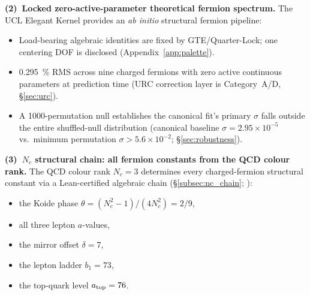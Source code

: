 \documentclass[11pt]{article}
\theoremstyle{remark}
\begin{document}
\medskip
\noindent\textbf{(2)~Locked zero-active-parameter theoretical fermion spectrum.}
The UCL Elegant Kernel provides an \emph{ab initio} structural fermion pipeline:
\begin{itemize}[leftmargin=1.5em,itemsep=0.15em,topsep=0.2em]
  \item Load-bearing algebraic identities are fixed by GTE/Quarter-Lock; one centering DOF is disclosed (Appendix~\ref{app:palette}).
  \item \SI{0.295}{\percent} RMS across nine charged fermions with zero active continuous parameters at prediction time (URC correction layer is Category~A/D, \S\ref{sec:urc}).
  \item A 1000-permutation null establishes the canonical fit's primary $\sigma$ falls outside the entire shuffled-null distribution (canonical baseline $\sigma = 2.95\times10^{-5}$ vs.\ minimum permutation $\sigma > 5.6\times10^{-2}$; \S\ref{sec:robustness}).
\end{itemize}


\medskip
\noindent\textbf{(3)~$N_c$ structural chain: all fermion constants from the QCD colour rank.}
The QCD colour rank $N_c = 3$ determines every charged-fermion structural constant via a Lean-certified algebraic chain (\S\ref{subsec:nc_chain}; ):
\begin{itemize}[leftmargin=1.5em,itemsep=0.1em,topsep=0.2em]
  \item the Koide phase $\theta = (N_c^2{-}1)/(4N_c^2) = 2/9$,
  \item all three lepton $a$-values,
  \item the mirror offset $\delta = 7$,
  \item the lepton ladder $b_1 = 73$,
  \item the top-quark level $a_{\rm top} = 76$.
\end{itemize}
\end{document}
